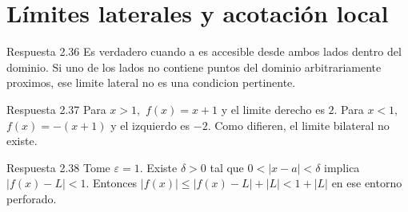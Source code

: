 \documentclass[10pt,a4paper,oneside,openany]{book}
\begin{document}
\section{Límites laterales y acotación local}
\begin{PSevenAnswerFixed}{Respuesta 2.36}
Es verdadero cuando a es accesible desde ambos lados dentro del dominio. Si uno de los lados no contiene puntos del dominio arbitrariamente proximos, ese limite lateral no es una condicion pertinente.
\end{PSevenAnswerFixed}
\begin{PSevenAnswerFixed}{Respuesta 2.37}
Para \(x>1,\) \(f(x)=x+1\) y el limite derecho es \(2\). Para \(x<1,\) \(f(x)=-(x+1)\) y el izquierdo es \(-2\). Como difieren, el limite bilateral no existe.
\end{PSevenAnswerFixed}
\begin{PSevenAnswerFixed}{Respuesta 2.38}
Tome \(\varepsilon =1\). Existe \(\delta >0\) tal que \(0<|x-a|<\delta \) implica \(|f(x)-L|<1\). Entonces \(|f(x)|\le |f(x)-L|+|L|<1+|L|\) en ese entorno perforado.
\end{PSevenAnswerFixed}
\end{document}
